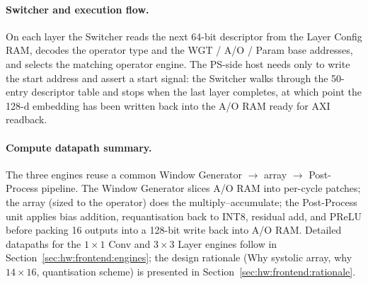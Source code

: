 \paragraph{Switcher and execution flow.}
On each layer the Switcher reads the next 64-bit descriptor from the Layer Config RAM, decodes the operator type and the WGT / A/O / Param base addresses, and selects the matching operator engine. The PS-side host needs only to write the start address and assert a start signal: the Switcher walks through the 50-entry descriptor table and stops when the last layer completes, at which point the 128-d embedding has been written back into the A/O RAM ready for AXI readback.

\paragraph{Compute datapath summary.}
The three engines reuse a common Window Generator $\rightarrow$ array $\rightarrow$ Post-Process pipeline. The Window Generator slices A/O RAM into per-cycle patches; the array (sized to the operator) does the multiply--accumulate; the Post-Process unit applies bias addition, requantisation back to INT8, residual add, and PReLU before packing 16 outputs into a 128-bit write back into A/O RAM. Detailed datapaths for the $1\times1$ Conv and $3\times3$ Layer engines follow in Section~\ref{sec:hw:frontend:engines}; the design rationale (Why systolic array, why $14\times16$, quantisation scheme) is presented in Section~\ref{sec:hw:frontend:rationale}.
